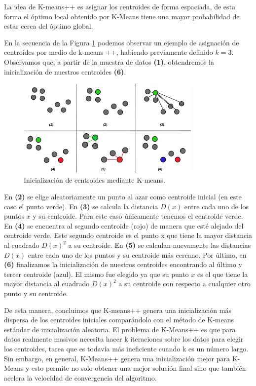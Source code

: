 \documentclass[12pt,a4paper]{article}
\begin{document}
\begin{sloppypar}
La idea de K-means++ es asignar los centroides de forma espaciada, de esta forma el óptimo local obtenido por K-Means tiene una mayor probabilidad de estar cerca del óptimo global.

\cleardoublepage
En la secuencia de la Figura \ref{fig:K_means_plus_plus} podemos observar un ejemplo de asignación de centroides por medio de k-means ++, habiendo previamente definido $k=3$. Observamos que, a partir de la muestra de datos \textbf{(1)}, obtendremos la inicialización de nuestros centroides \textbf{(6)}.\\

\begin{figure}[H]    %
 \centering
 \includegraphics[width=0.8\textwidth]{images/K_means_plus_plus.png}
 \captionsetup{justification=centering,margin=1cm}
 \caption{Inicialización de centroides mediante K-means.}
 \label{fig:K_means_plus_plus}
\end{figure} 

En \textbf{(2)} se elige aleatoriamente un punto al azar como centroide inicial (en este caso el punto verde).
En \textbf{(3)} se calcula la distancia $D(x)$ entre cada uno de los puntos $x$ y su centroide. Para este caso únicamente tenemos el centroide verde. 
En \textbf{(4)} se encuentra al segundo centroide (rojo) de manera que esté alejado del centroide verde. Este segundo centroide es el punto x que tiene la mayor distancia al cuadrado $D(x)^2$ a su centroide.
En \textbf{(5)} se calculan nuevamente las distancias $D(x)$ entre cada uno de los puntos y su centroide más cercano.
Por último, en \textbf{(6)} finalizamos la inicialización de nuestros centroides encontrando al último y tercer centroide (azul). El mismo fue elegido ya que su punto $x$ es el que tiene la mayor distancia al cuadrado $D(x)^2$ a su centroide con respecto a cualquier otro punto y su centroide.

De esta manera, concluimos que K-means++ genera una inicialización más dispersa de los centroides iniciales comparándolo con el método de K-means estándar de inicialización aleatoria. El problema de K-Means++ es que para datos realmente masivos necesita hacer k iteraciones sobre los datos para elegir los centroides, tarea que es todavía más ineficiente cuando k es un número largo. Sin embargo, en general, K-Means++ genera una inicialización mejor para K-Means y esto permite no solo obtener una mejor solución final sino que también acelera la velocidad de convergencia del algoritmo.


\end{sloppypar}
\end{document}
